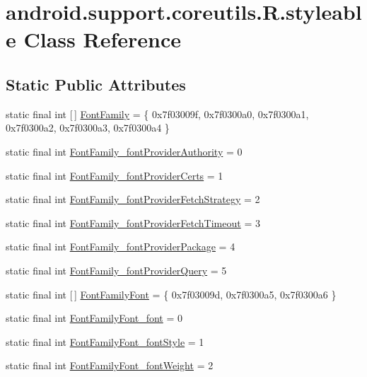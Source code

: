\hypertarget{classandroid_1_1support_1_1coreutils_1_1R_1_1styleable}{}\section{android.\+support.\+coreutils.\+R.\+styleable Class Reference}
\label{classandroid_1_1support_1_1coreutils_1_1R_1_1styleable}
\subsection*{Static Public Attributes}
\begin{DoxyCompactItemize}
\item 
static final int \mbox{[}$\,$\mbox{]} \mbox{\hyperlink{classandroid_1_1support_1_1coreutils_1_1R_1_1styleable_a909802582dff4a121b96f894071a74d4}{Font\+Family}} = \{ 0x7f03009f, 0x7f0300a0, 0x7f0300a1, 0x7f0300a2, 0x7f0300a3, 0x7f0300a4 \}
\item 
static final int \mbox{\hyperlink{classandroid_1_1support_1_1coreutils_1_1R_1_1styleable_a3dde202e500185c4dd9e5cb5d397ac1d}{Font\+Family\+\_\+font\+Provider\+Authority}} = 0
\item 
static final int \mbox{\hyperlink{classandroid_1_1support_1_1coreutils_1_1R_1_1styleable_af3414a02529093edfb982aed33d06f8a}{Font\+Family\+\_\+font\+Provider\+Certs}} = 1
\item 
static final int \mbox{\hyperlink{classandroid_1_1support_1_1coreutils_1_1R_1_1styleable_a90712a2006d458ca15f64ad68931cd5a}{Font\+Family\+\_\+font\+Provider\+Fetch\+Strategy}} = 2
\item 
static final int \mbox{\hyperlink{classandroid_1_1support_1_1coreutils_1_1R_1_1styleable_ae910707deacdf54439bfd9e6e86e918e}{Font\+Family\+\_\+font\+Provider\+Fetch\+Timeout}} = 3
\item 
static final int \mbox{\hyperlink{classandroid_1_1support_1_1coreutils_1_1R_1_1styleable_a25776ad0f93b1067fcc6adeed3629cbb}{Font\+Family\+\_\+font\+Provider\+Package}} = 4
\item 
static final int \mbox{\hyperlink{classandroid_1_1support_1_1coreutils_1_1R_1_1styleable_a511cef8a2fc759485401243861232103}{Font\+Family\+\_\+font\+Provider\+Query}} = 5
\item 
static final int \mbox{[}$\,$\mbox{]} \mbox{\hyperlink{classandroid_1_1support_1_1coreutils_1_1R_1_1styleable_a92afa7abc4eaed5ef5e8ba232700bcc8}{Font\+Family\+Font}} = \{ 0x7f03009d, 0x7f0300a5, 0x7f0300a6 \}
\item 
static final int \mbox{\hyperlink{classandroid_1_1support_1_1coreutils_1_1R_1_1styleable_a41e7c4e2289d6c79cf8d1727e98c88a6}{Font\+Family\+Font\+\_\+font}} = 0
\item 
static final int \mbox{\hyperlink{classandroid_1_1support_1_1coreutils_1_1R_1_1styleable_a1ee3d7ad4f282f1250a3ef4c1cb44053}{Font\+Family\+Font\+\_\+font\+Style}} = 1
\item 
static final int \mbox{\hyperlink{classandroid_1_1support_1_1coreutils_1_1R_1_1styleable_a08ae17280f865bcf7bb8a223b10003cd}{Font\+Family\+Font\+\_\+font\+Weight}} = 2
\end{DoxyCompactItemize}


